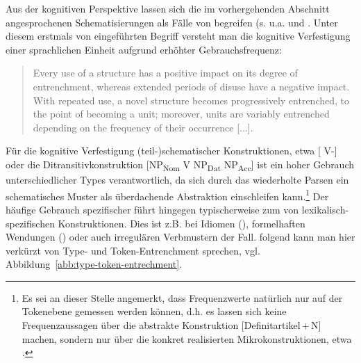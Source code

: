 \begin{sloppypar}Aus der kognitiven Perspektive lassen sich die im vorhergehenden Abschnitt angesprochenen Schematisierungen  als Fälle von  begreifen (s. u.a. \citealt{Langacker1987,Langacker2008,Goldberg1995,Goldberg2006,Bybee2006,Bybee2010} und \citealt{Schmid2007,Schmid2016}. 
Unter diesem erstmals von \citeauthor{Langacker1987} eingeführten Begriff versteht man die kognitive Verfestigung einer sprachlichen Einheit aufgrund erhöhter Gebrauchsfrequenz:\end{sloppypar}\blockcquote[59]{Langacker1987}{Every use of a structure has a positive impact on its degree of entrenchment, whereas extended periods of disuse have a negative impact. With repeated use, a novel structure becomes progressively entrenched, to the point of becoming a unit; moreover, units are variably entrenched depending on the frequency of their occurrence [...].} 

Für die kognitive Verfestigung (teil-)schematischer   Konstruktionen, 
etwa [ V-] \parencite{Flick2016} oder  die Ditransitivkonstruktion   [NP\textsubscript{Nom} V NP\textsubscript{Dat} NP\textsubscript{Acc}] \parencite{Goldberg2006} ist ein hoher Gebrauch unterschiedlicher Types  verantwortlich, da sich durch das wiederholte Parsen ein schematisches Muster als überdachende Abstraktion einschleifen kann.\footnote{Es sei an dieser Stelle angemerkt, dass Frequenzwerte natürlich nur auf der Tokenebene  gemessen werden können, d.h. es lassen sich keine Frequenzaussagen über die abstrakte Konstruktion   [Definitartikel\,+\,N] machen, sondern nur über die konkret realisierten Mikrokonstruktionen, etwa .} 
Der häufige Gebrauch spezifischer  führt hingegen typischerweise zum  von lexikalisch-spe\-zi\-fisch\-en Konstruktionen. Dies ist z.B. bei Idiomen (), formelhaften Wendungen () oder auch irregulären Verbmustern der Fall. \textcite[103--104]{Ziem2013} folgend kann man hier verkürzt von Type- und Token-Entrenchment   sprechen, vgl. Abbildung~\ref{abb:type-token-entrechment}.

